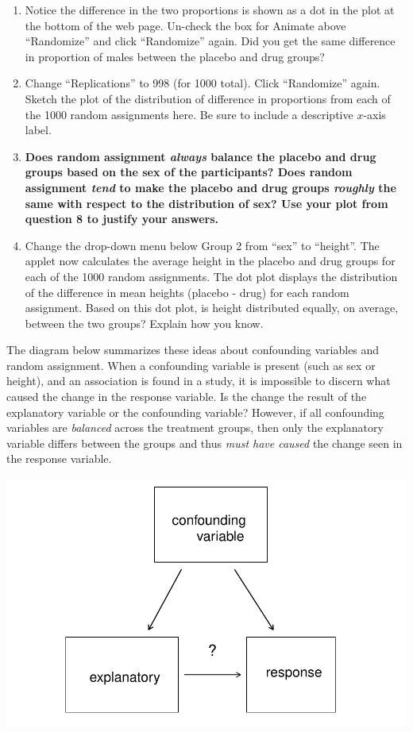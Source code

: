 \documentclass[
]{report}
\begin{document}
\begin{enumerate}
\def\labelenumi{\arabic{enumi}.}
\setcounter{enumi}{6}
\item
  Notice the difference in the two proportions is shown as a dot in the plot at the bottom of the web page. Un-check the box for Animate above ``Randomize'' and click ``Randomize'' again. Did you get the same difference in proportion of males between the placebo and drug groups?
  \vspace{0.25in}
\item
  Change ``Replications'' to 998 (for 1000 total). Click ``Randomize'' again. Sketch the plot of the distribution of difference in proportions from each of the 1000 random assignments here. Be sure to include a descriptive \(x\)-axis label.
  \vspace{1.25in}
\item
  \textbf{Does random assignment \emph{always} balance the placebo and drug groups based on the sex of the participants? Does random assignment \emph{tend} to make the placebo and drug groups \emph{roughly} the same with respect to the distribution of sex? Use your plot from question 8 to justify your answers.}
  \vspace{0.5in}
\item
  Change the drop-down menu below Group 2 from ``sex'' to ``height''. The applet now calculates the average height in the placebo and drug groups for each of the 1000 random assignments. The dot plot displays the distribution of the difference in mean heights (placebo - drug) for each random assignment. Based on this dot plot, is height distributed equally, on average, between the two groups? Explain how you know.
  \vspace{0.5in}
\end{enumerate}

\newpage

The diagram below summarizes these ideas about confounding variables and random assignment. When a confounding variable is present (such as sex or height), and an association is found in a study, it is impossible to discern what caused the change in the response variable. Is the change the result of the explanatory variable or the confounding variable? However, if all confounding variables are \emph{balanced} across the treatment groups, then only the explanatory variable differs between the groups and thus \emph{must have caused} the change seen in the response variable.

\begin{center}\includegraphics[width=0.4\linewidth]{02-L01-random-assignment_files/figure-latex/unnamed-chunk-1-1} \end{center}
\end{document}
